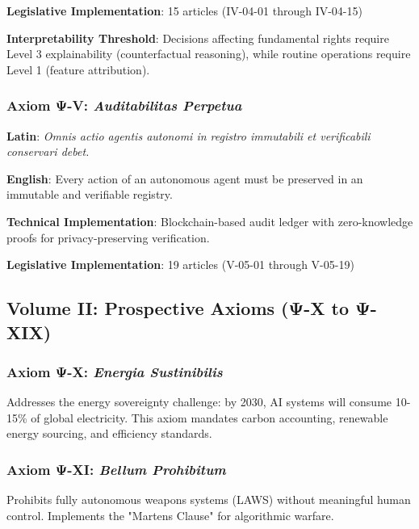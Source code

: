 \textbf{Legislative Implementation}: 15 articles (IV-04-01 through IV-04-15)

\textbf{Interpretability Threshold}: Decisions affecting fundamental rights require Level 3 explainability (counterfactual reasoning), while routine operations require Level 1 (feature attribution).

\vspace{0.5cm}

\subsubsection{Axiom Ψ-V: \textit{Auditabilitas Perpetua}}

\begin{tcolorbox}[colback=red!5!white,colframe=red!75!black,title=Formal Statement]
\textbf{Latin}: \textit{Omnis actio agentis autonomi in registro immutabili et verificabili conservari debet.}

\textbf{English}: Every action of an autonomous agent must be preserved in an immutable and verifiable registry.

\textbf{Technical Implementation}: Blockchain-based audit ledger with zero-knowledge proofs for privacy-preserving verification.
\end{tcolorbox}

\textbf{Legislative Implementation}: 19 articles (V-05-01 through V-05-19)

\vspace{1cm}

\subsection{Volume II: Prospective Axioms (Ψ-X to Ψ-XIX)}

\subsubsection{Axiom Ψ-X: \textit{Energia Sustinibilis}}

Addresses the energy sovereignty challenge: by 2030, AI systems will consume 10-15\% of global electricity. This axiom mandates carbon accounting, renewable energy sourcing, and efficiency standards.

\subsubsection{Axiom Ψ-XI: \textit{Bellum Prohibitum}}

Prohibits fully autonomous weapons systems (LAWS) without meaningful human control. Implements the "Martens Clause" for algorithmic warfare.

